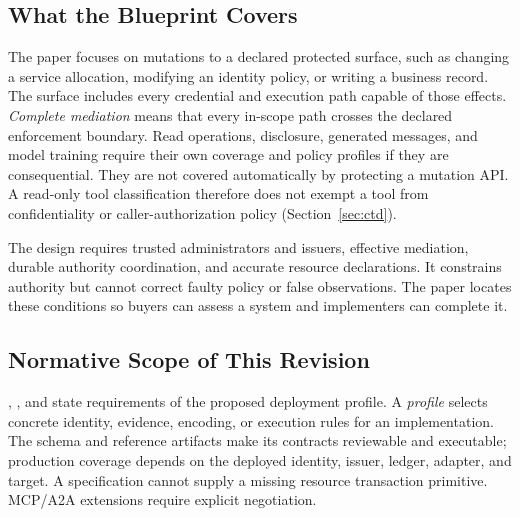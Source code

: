 \subsection{What the Blueprint Covers}
The paper focuses on mutations to a declared protected surface, such as changing a service allocation, modifying an identity policy, or writing a business record. The surface includes every credential and execution path capable of those effects. \emph{Complete mediation} means that every in-scope path crosses the declared enforcement boundary. Read operations, disclosure, generated messages, and model training require their own coverage and policy profiles if they are consequential. They are not covered automatically by protecting a mutation API. A read-only tool classification therefore does not exempt a tool from confidentiality or caller-authorization policy (Section~\ref{sec:ctd}).

The design requires trusted administrators and issuers, effective mediation, durable authority coordination, and accurate resource declarations. It constrains authority but cannot correct faulty policy or false observations. The paper locates these conditions so buyers can assess a system and implementers can complete it.

\subsection{Normative Scope of This Revision}
, , and  state requirements of the proposed deployment profile. A \emph{profile} selects concrete identity, evidence, encoding, or execution rules for an implementation. The schema and reference artifacts make its contracts reviewable and executable; production coverage depends on the deployed identity, issuer, ledger, adapter, and target. A specification cannot supply a missing resource transaction primitive. MCP/A2A extensions require explicit negotiation.

